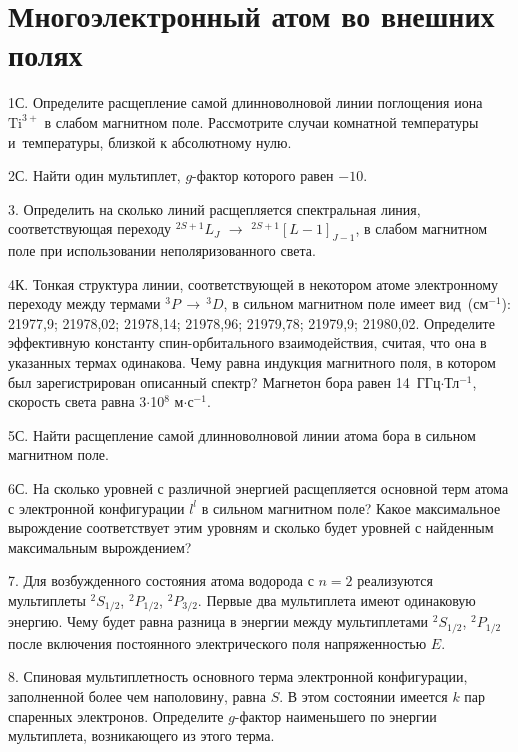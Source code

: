 \setmainfont{Noto Serif}
\setsansfont{Noto Sans}
\setmonofont{Noto Sans Mono}


\section{Многоэлектронный атом во внешних полях}

1С. Определите расщепление самой длинноволновой линии поглощения иона $\text{Ti}^{3+}$ в слабом магнитном поле. Рассмотрите случаи комнатной температуры и~температуры, близкой к абсолютному нулю.
\par
2С. Найти один мультиплет, $g$-фактор которого равен $-10$.
\par
3. Определить на сколько линий расщепляется спектральная линия, соответствующая переходу $^{2S+1}L_J$ $\rightarrow$ $^{2S+1}[L-1]_{J-1}$, в слабом магнитном поле при использовании неполяризованного света.
\par
4К. Тонкая структура линии, соответствующей в некотором атоме электронному переходу между термами $^3P \,\rightarrow\,^3D$, в сильном магнитном поле имеет вид~(см$^{-1}$): 21977,9; 21978,02; 21978,14; 21978,96; 21979,78; 21979,9; 21980,02. Определите эффективную константу спин-орбитального взаимодействия, считая, что она в указанных термах одинакова. Чему равна индукция магнитного поля, в котором был зарегистрирован описанный спектр? Магнетон бора равен 14~ГГц$\cdot$Тл$^{-1}$, скорость света равна 3$\cdot$10$^8$ м$\cdot$с$^{-1}$.
\par
5С. Найти расщепление самой длинноволновой линии атома бора в сильном магнитном поле.
\par
6С. На сколько уровней с различной энергией расщепляется основной терм атома с электронной конфигурации $l^l$ в сильном магнитном поле? Какое максимальное вырождение соответствует этим уровням и сколько будет уровней с найденным максимальным вырождением?
\par
7. Для возбужденного состояния атома водорода с $n = 2$ реализуются мультиплеты $^2S_{1/2}$, $^2P_{1/2}$, $^2P_{3/2}$. Первые два мультиплета имеют одинаковую энергию. Чему будет равна разница в энергии между мультиплетами $^2S_{1/2}$, $^2P_{1/2}$ после включения постоянного электрического поля напряженностью $E$.
\par
8. Спиновая мультиплетность основного терма электронной конфигурации, заполненной более чем наполовину, равна $S$. В этом состоянии имеется $k$ пар спаренных электронов. Определите $g$-фактор наименьшего по энергии мультиплета, возникающего из этого терма.

